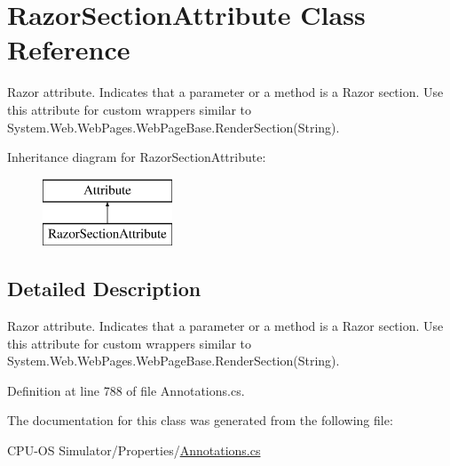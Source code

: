 \hypertarget{class_razor_section_attribute}{}\section{Razor\+Section\+Attribute Class Reference}
\label{class_razor_section_attribute}


Razor attribute. Indicates that a parameter or a method is a Razor section. Use this attribute for custom wrappers similar to {\ttfamily System.\+Web.\+Web\+Pages.\+Web\+Page\+Base.\+Render\+Section(\+String)}.  


Inheritance diagram for Razor\+Section\+Attribute\+:\begin{figure}[H]
\begin{center}
\leavevmode
\includegraphics[height=2.000000cm]{class_razor_section_attribute}
\end{center}
\end{figure}


\subsection{Detailed Description}
Razor attribute. Indicates that a parameter or a method is a Razor section. Use this attribute for custom wrappers similar to {\ttfamily System.\+Web.\+Web\+Pages.\+Web\+Page\+Base.\+Render\+Section(\+String)}. 



Definition at line 788 of file Annotations.\+cs.



The documentation for this class was generated from the following file\+:\begin{DoxyCompactItemize}
\item 
C\+P\+U-\/\+O\+S Simulator/\+Properties/\hyperlink{_annotations_8cs}{Annotations.\+cs}\end{DoxyCompactItemize}
